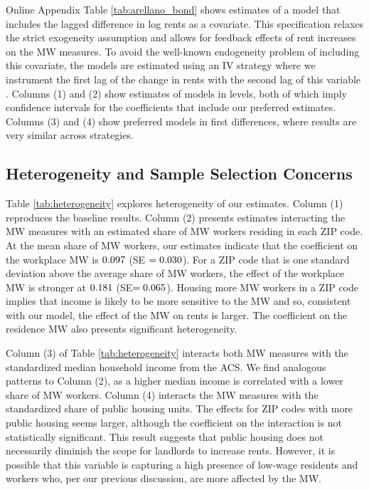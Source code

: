 Online Appendix Table \ref{tab:arellano_bond} shows estimates of a model that 
includes the lagged difference in log rents as a covariate.
This specification relaxes the strict exogeneity assumption and allows for 
feedback effects of rent increases on the MW measures.
To avoid the well-known endogeneity problem of including this covariate, the 
models are estimated using an IV strategy where we instrument the first lag of 
the change in rents with the second lag of this variable 
\parencite{ArellanoBond1991, ArellanoHonore2001}.
Columns (1) and (2) show estimates of models in levels, both of which imply
confidence intervals for the coefficients that include our preferred estimates.
Columns (3) and (4) show preferred models in first differences, where results
are very similar across strategies. 

\subsection{Heterogeneity and Sample Selection Concerns}
\label{sec:results_heterogeneity}

Table \ref{tab:heterogeneity} explores heterogeneity of our estimates.
Column (1) reproduces the baseline results.
Column (2) presents estimates interacting the MW measures with an estimated 
share of MW workers residing in each ZIP code.
At the mean share of MW workers, our estimates indicate that the coefficient
on the workplace MW is $0.097$ (SE $=0.030$).
For a ZIP code that is one standard deviation above the average share of MW 
workers, the effect of the workplace MW is stronger at
$0.181$ (SE$=0.065$).
Housing more MW workers in a ZIP code implies that income is likely to be more 
sensitive to the MW and so, consistent with our model, the effect of the MW
on rents is larger.
The coefficient on the residence MW also presents significant heterogeneity.

Column (3) of Table \ref{tab:heterogeneity} interacts both MW measures with the
standardized median household income from the ACS.
We find analogous patterns to Column (2), as a higher median income is 
correlated with a lower share of MW workers.
Column (4) interacts the MW measures with the standardized share of public 
housing units.
The effects for ZIP codes with more public housing seems larger,
although the coefficient on the interaction is not statistically significant. 
This result suggests that public housing does not necessarily diminish the 
scope for landlords to increase rents.
However, it is possible that this variable is capturing a high presence of 
low-wage residents and workers who, per our previous discussion, are more 
affected by the MW.

